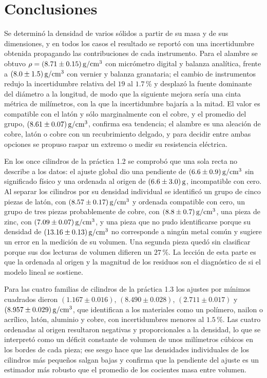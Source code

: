 \section{Conclusiones}

Se determinó la densidad de varios sólidos a partir de su masa y de sus dimensiones, y en todos los casos el resultado se reportó con una incertidumbre obtenida propagando las contribuciones de cada instrumento. Para el alambre se obtuvo $\rho = (8.71 \pm 0.15)\,\mathrm{g/cm^{3}}$ con micrómetro digital y balanza analítica, frente a $(8.0 \pm 1.5)\,\mathrm{g/cm^{3}}$ con vernier y balanza granataria; el cambio de instrumentos redujo la incertidumbre relativa del $19$ al $1.7\,\%$ y desplazó la fuente dominante del diámetro a la longitud, de modo que la siguiente mejora sería una cinta métrica de milímetros, con la que la incertidumbre bajaría a la mitad. El valor es compatible con el latón y sólo marginalmente con el cobre, y el promedio del grupo, $(8.61 \pm 0.07)\,\mathrm{g/cm^{3}}$, confirma esa tendencia; el alambre es una aleación de cobre, latón o cobre con un recubrimiento delgado, y para decidir entre ambas opciones se propuso raspar un extremo o medir su resistencia eléctrica.

En los once cilindros de la práctica 1.2 se comprobó que una sola recta no describe a los datos: el ajuste global dio una pendiente de $(6.6 \pm 0.9)\,\mathrm{g/cm^{3}}$ sin significado físico y una ordenada al origen de $(6.6 \pm 3.0)\,\mathrm{g}$, incompatible con cero. Al separar los cilindros por su densidad individual se identificó un grupo de cinco piezas de latón, con $(8.57 \pm 0.17)\,\mathrm{g/cm^{3}}$ y ordenada compatible con cero, un grupo de tres piezas probablemente de cobre, con $(8.8 \pm 0.7)\,\mathrm{g/cm^{3}}$, una pieza de zinc, con $(7.09 \pm 0.07)\,\mathrm{g/cm^{3}}$, y una pieza que no pudo identificarse porque su densidad de $(13.16 \pm 0.13)\,\mathrm{g/cm^{3}}$ no corresponde a ningún metal común y sugiere un error en la medición de su volumen. Una segunda pieza quedó sin clasificar porque sus dos lecturas de volumen difieren un $27\,\%$. La lección de esta parte es que la ordenada al origen y la magnitud de los residuos son el diagnóstico de si el modelo lineal se sostiene.

Para las cuatro familias de cilindros de la práctica 1.3 los ajustes por mínimos cuadrados dieron $(1.167 \pm 0.016)$, $(8.490 \pm 0.028)$, $(2.711 \pm 0.017)$ y $(8.957 \pm 0.029)\,\mathrm{g/cm^{3}}$, que identifican a los materiales como un polímero, nailon o acrílico, latón, aluminio y cobre, con incertidumbres menores al $1.5\,\%$. Las cuatro ordenadas al origen resultaron negativas y proporcionales a la densidad, lo que se interpretó como un déficit constante de volumen de unos milímetros cúbicos en los bordes de cada pieza; ese sesgo hace que las densidades individuales de los cilindros más pequeños salgan bajas y confirma que la pendiente del ajuste es un estimador más robusto que el promedio de los cocientes masa entre volumen.

